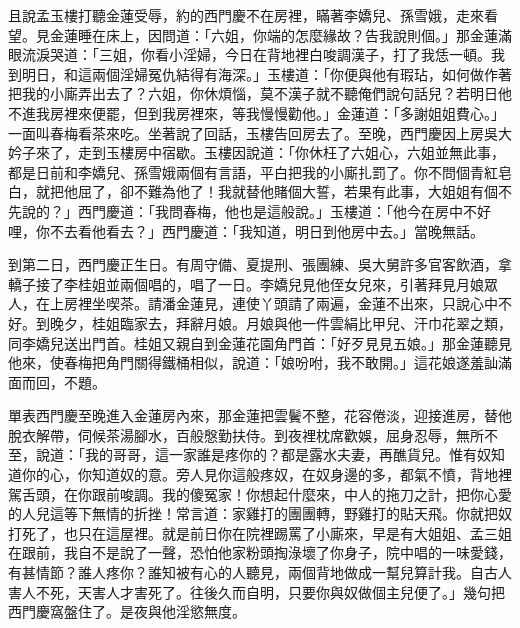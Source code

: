 且說孟玉樓打聽金蓮受辱，約的西門慶不在房裡，瞞著李嬌兒、孫雪娥，走來看望。見金蓮睡在床上，因問道：「六姐，你端的怎麼緣故？告我說則個。」那金蓮滿眼流淚哭道：「三姐，你看小淫婦，今日在背地裡白唆調漢子，打了我恁一頓。我到明日，和這兩個淫婦冤仇結得有海深。」玉樓道：「你便與他有瑕玷，如何做作著把我的小廝弄出去了？六姐，你休煩惱，莫不漢子就不聽俺們說句話兒？若明日他不進我房裡來便罷，但到我房裡來，等我慢慢勸他。」金蓮道：「多謝姐姐費心。」一面叫春梅看茶來吃。坐著說了回話，玉樓告回房去了。至晚，西門慶因上房吳大妗子來了，走到玉樓房中宿歇。玉樓因說道：「你休枉了六姐心，六姐並無此事，都是日前和李嬌兒、孫雪娥兩個有言語，平白把我的小廝扎罰了。你不問個青紅皂白，就把他屈了，卻不難為他了！我就替他賭個大誓，若果有此事，大姐姐有個不先說的？」西門慶道：「我問春梅，他也是這般說。」玉樓道：「他今在房中不好哩，你不去看他看去？」西門慶道：「我知道，明日到他房中去。」當晚無話。

到第二日，西門慶正生日。有周守備、夏提刑、張團練、吳大舅許多官客飲酒，拿轎子接了李桂姐並兩個唱的，唱了一日。李嬌兒見他侄女兒來，引著拜見月娘眾人，在上房裡坐喫茶。請潘金蓮見，連使丫頭請了兩遍，金蓮不出來，只說心中不好。到晚夕，桂姐臨家去，拜辭月娘。月娘與他一件雲絹比甲兒、汗巾花翠之類，同李嬌兒送出門首。桂姐又親自到金蓮花園角門首：「好歹見見五娘。」那金蓮聽見他來，使春梅把角門關得鐵桶相似，說道：「娘吩咐，我不敢開。」這花娘遂羞訕滿面而回，不題。

單表西門慶至晚進入金蓮房內來，那金蓮把雲鬢不整，花容倦淡，迎接進房，替他脫衣解帶，伺候茶湯腳水，百般慇勤扶侍。到夜裡枕席歡娛，屈身忍辱，無所不至，說道：「我的哥哥，這一家誰是疼你的？都是露水夫妻，再醮貨兒。惟有奴知道你的心，你知道奴的意。旁人見你這般疼奴，在奴身邊的多，都氣不憤，背地裡駕舌頭，在你跟前唆調。我的傻冤家！你想起什麼來，中人的拖刀之計，把你心愛的人兒這等下無情的折挫！常言道：家雞打的團團轉，野雞打的貼天飛。你就把奴打死了，也只在這屋裡。就是前日你在院裡踢罵了小廝來，早是有大姐姐、孟三姐在跟前，我自不是說了一聲，恐怕他家粉頭掏淥壞了你身子，院中唱的一味愛錢，有甚情節？誰人疼你？誰知被有心的人聽見，兩個背地做成一幫兒算計我。自古人害人不死，天害人才害死了。往後久而自明，只要你與奴做個主兒便了。」幾句把西門慶窩盤住了。是夜與他淫慾無度。

